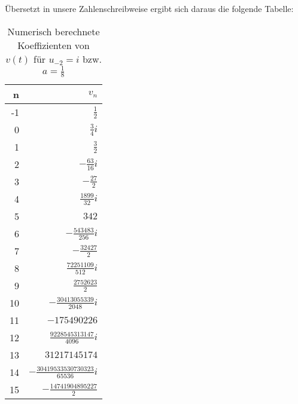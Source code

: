 Übersetzt in unsere Zahlenschreibweise ergibt sich daraus die folgende Tabelle:
\begin{table}[H] %
\begin{center}
\begin{tabular}{|r||r|}
\hline
n        & $v_n$
\\\hline\hline
  -1 & $\frac{1}{2}$
\\0  & $\frac{3}{4}i$
\\1  & $\frac{3}{2}$
\\2  & $-\frac{63}{16}i$
\\3  & $-\frac{27}{2}$
\\4  & $\frac{1899}{32}i$
\\5  & $342$
\\6  & $-\frac{543483}{256}i$
\\7  & $-\frac{32427}{2}$
\\8  & $\frac{72251109}{512}i$
\\9  & $\frac{2752623}{2}$
\\10 & $-\frac{30413055339}{2048}i$
\\11 & $-175490226$
\\12 & $\frac{9228545313147}{4096}i$
\\13 & $31217145174$
\\14 & $-\frac{30419533530730323}{65536}i$
\\15 & $-\frac{14741904895227}{2}$
\\\hline
\end{tabular}
\caption{Numerisch berechnete Koeffizienten von $v(t)$ für $u_{-2}=i$ bzw.
  $a=\frac{1}{8}$}
\label{tab:koeff_a=0.125}
\end{center}
\end{table}

